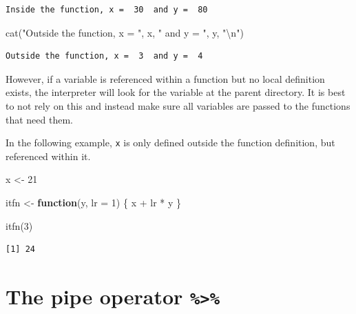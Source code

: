 \documentclass[
]{book}
\newenvironment{Shaded}{\begin{snugshade}}{\end{snugshade}}
\newcommand{\AttributeTok}[1]{\textcolor[rgb]{0.77,0.63,0.00}{#1}}
\newcommand{\ControlFlowTok}[1]{\textcolor[rgb]{0.13,0.29,0.53}{\textbf{#1}}}
\newcommand{\DecValTok}[1]{\textcolor[rgb]{0.00,0.00,0.81}{#1}}
\newcommand{\FunctionTok}[1]{\textcolor[rgb]{0.00,0.00,0.00}{#1}}
\newcommand{\NormalTok}[1]{#1}
\newcommand{\OtherTok}[1]{\textcolor[rgb]{0.56,0.35,0.01}{#1}}
\newcommand{\SpecialCharTok}[1]{\textcolor[rgb]{0.00,0.00,0.00}{#1}}
\newcommand{\StringTok}[1]{\textcolor[rgb]{0.31,0.60,0.02}{#1}}
\begin{document}
\begin{verbatim}
Inside the function, x =  30  and y =  80 
\end{verbatim}

\begin{Shaded}
\begin{Highlighting}[]
\FunctionTok{cat}\NormalTok{(}\StringTok{"Outside the function, x = "}\NormalTok{, x, }\StringTok{" and y = "}\NormalTok{, y, }\StringTok{"}\SpecialCharTok{\textbackslash{}n}\StringTok{"}\NormalTok{)}
\end{Highlighting}
\end{Shaded}

\begin{verbatim}
Outside the function, x =  3  and y =  4 
\end{verbatim}

However, if a variable is referenced within a function but no local definition exists, the interpreter will look for the variable at the parent directory. It is best to not rely on this and instead make sure all variables are passed to the functions that need them.

In the following example, \texttt{x} is only defined outside the function definition, but referenced within it.

\begin{Shaded}
\begin{Highlighting}[]
\NormalTok{x }\OtherTok{\textless{}{-}} \DecValTok{21}

\NormalTok{itfn }\OtherTok{\textless{}{-}} \ControlFlowTok{function}\NormalTok{(y, }\AttributeTok{lr =} \DecValTok{1}\NormalTok{) \{}
\NormalTok{  x }\SpecialCharTok{+}\NormalTok{ lr }\SpecialCharTok{*}\NormalTok{ y}
\NormalTok{\}}

\FunctionTok{itfn}\NormalTok{(}\DecValTok{3}\NormalTok{)}
\end{Highlighting}
\end{Shaded}

\begin{verbatim}
[1] 24
\end{verbatim}

\hypertarget{pipe}{%
\section{\texorpdfstring{The pipe operator \texttt{\%\textgreater{}\%}}{The pipe operator \%\textgreater\%}}\label{pipe}}
\end{document}
